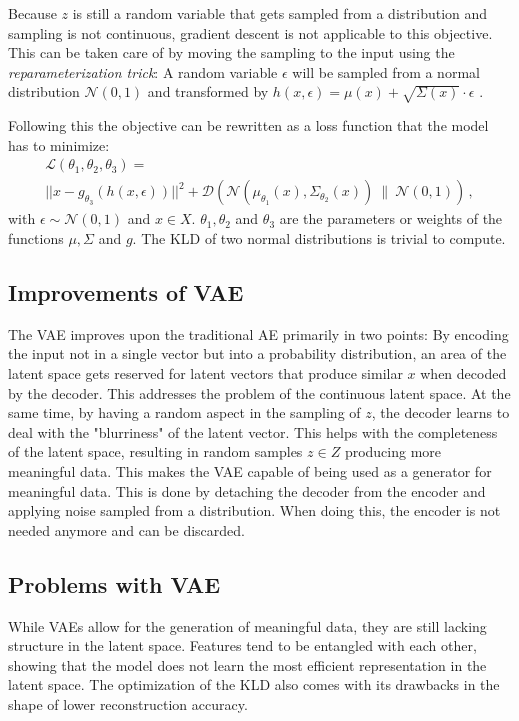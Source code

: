 \documentclass[a4paper]{IEEEtran}
\begin{document}
{Because $z$ is still a random variable that gets sampled from a distribution and sampling is not continuous, gradient descent is not applicable to this objective. This can be taken care of by moving the sampling to the input using the \textit{reparameterization trick}: A random variable $\epsilon$ will be sampled from a normal distribution $\mathcal{N}(0,1)$ and transformed by $h(x, \epsilon) = \mu(x) + \sqrt{\Sigma(x)} \cdot \epsilon$ \cite{doersch2016tutorial}. 

Following this the objective can be rewritten as a loss function that the model has to minimize:
\begin{gather}
	\mathcal{L}(\theta_1, \theta_2, \theta_3) = \\ 
	||x - g_{\theta_3}(h(x, \epsilon))||^2 + \mathcal{D}(\mathcal{N}(\mu_{\theta_1}(x), \Sigma_{\theta_2}(x)) \ \| \ \mathcal{N}(0, 1))\,,
	\label{vae_loss}
\end{gather}
with $\epsilon \sim \mathcal{N}(0,1)$ and $x \in X$. $\theta_1, \theta_2$ and $\theta_3$ are the parameters or weights of the functions $\mu, \Sigma$ and $g$. The KLD of two normal distributions is trivial to compute.

\subsection{Improvements of VAE}
The VAE improves upon the traditional AE primarily in two points:
By encoding the input not in a single vector but into a probability distribution, an area of the latent space gets reserved for latent vectors that produce similar $x$ when decoded by the decoder. This addresses the problem of the continuous latent space. At the same time, by having a random aspect in the sampling of $z$, the decoder learns to deal with the "blurriness" of the latent vector. This helps with the completeness of the latent space, resulting in random samples $z \in Z$ producing more meaningful data. This makes the VAE capable of being used as a generator for meaningful data. This is done by detaching the decoder from the encoder and applying noise sampled from a distribution. When doing this, the encoder is not needed anymore and can be discarded.

\subsection{Problems with VAE}
While VAEs allow for the generation of meaningful data, they are still lacking structure in the latent space. Features tend to be entangled with each other, showing that the model does not learn the most efficient representation in the latent space. The optimization of the KLD also comes with its drawbacks in the shape of lower reconstruction accuracy. 

}
\end{document}
